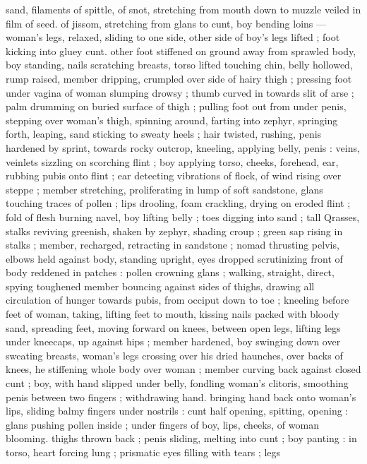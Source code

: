 sand, filaments of spittle, of snot, stretching from mouth down to 
muzzle veiled in film of seed. of jissom, stretching from glans to 
cunt, boy bending loins --- woman's legs, relaxed, sliding to one 
side, other side of boy's legs lifted ; foot kicking into gluey cunt. 
other foot stiffened on ground away from sprawled body, boy 
standing, nails scratching breasts, torso lifted touching chin, belly 
hollowed, rump raised, member dripping, crumpled over side of 
hairy thigh ; pressing foot under vagina of woman slumping drowsy 
; thumb curved in towards slit of arse ; palm drumming on buried 
surface of thigh ; pulling foot out from under penis, stepping over 
woman's thigh, spinning around, farting into zephyr, springing forth, 
leaping, sand sticking to sweaty heels ; hair twisted, rushing, penis 
hardened by sprint, towards rocky outcrop, kneeling, applying belly, 
penis : veins, veinlets sizzling on scorching flint ; boy applying torso, 
cheeks, forehead, ear, rubbing pubis onto flint ; ear detecting 
vibrations of flock, of wind rising over steppe ; member stretching, 
proliferating in lump of soft sandstone, glans touching traces of 
pollen ; lips drooling, foam crackling, drying on eroded flint ; fold of 
flesh burning navel, boy lifting belly ; toes digging into sand ; tall 
Qrasses, stalks reviving greenish, shaken by zephyr, shading croup ; 
green sap rising in stalks ; member, recharged, retracting in 
sandstone ; nomad thrusting pelvis, elbows held against body, 
standing upright, eyes dropped scrutinizing front of body reddened 
in patches : pollen crowning glans ; walking, straight, direct, spying 
toughened member bouncing against sides of thighs, drawing all 
circulation of hunger towards pubis, from occiput down to toe ; 
kneeling before feet of woman, taking, lifting feet to mouth, kissing 
nails packed with bloody sand, spreading feet, moving forward on 
knees, between open legs, lifting legs under kneecaps, up against 
hips ; member hardened, boy swinging down over sweating breasts, 
woman's legs crossing over his dried haunches, over backs of knees, 
he stiffening whole body over woman ; member curving back against 
closed cunt ; boy, with hand slipped under belly, fondling woman's 
clitoris, smoothing penis between two fingers ; withdrawing hand. 
bringing hand back onto woman's lips, sliding balmy fingers under 
nostrils : cunt half opening, spitting, opening : glans pushing pollen 
inside ; under fingers of boy, lips, cheeks, of woman blooming. 
thighs thrown back ; penis sliding, melting into cunt ; boy panting : 
in torso, heart forcing lung ; prismatic eyes filling with tears ; legs 
